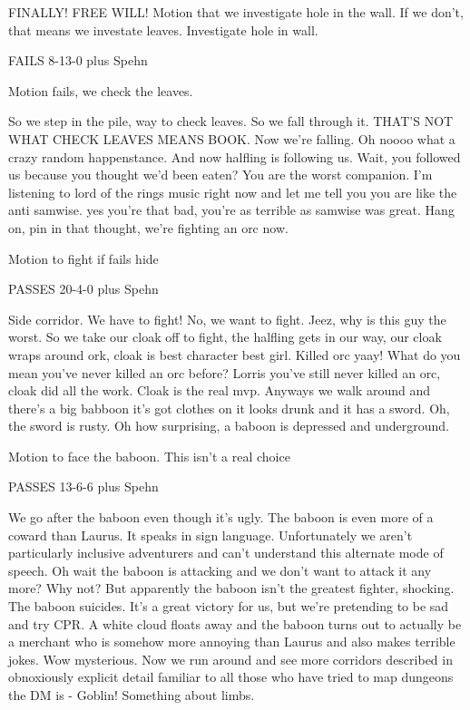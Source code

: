 \documentclass[10pt]{article}
\newcommand{\ps}{ plus Spehn\xspace}
\begin{document}
FINALLY! FREE WILL!
Motion that we investigate hole in the wall. If we don't, that means we investate leaves.
Investigate hole in wall.

FAILS 8-13-0\ps

Motion fails, we check the leaves.

So we step in the pile, way to check leaves. So we fall through it. THAT'S NOT WHAT CHECK LEAVES MEANS BOOK. Now we're falling. Oh noooo what a crazy random happenstance. And now halfling is following us. Wait, you followed us because you thought we'd been eaten? You are the worst companion. I'm listening to lord of the rings music right now and let me tell you you are like the anti samwise. yes you're that bad, you're as terrible as samwise was great. Hang on, pin in that thought, we're fighting an orc now.

Motion to fight if fails hide

PASSES 20-4-0\ps

Side corridor. We have to fight! No, we want to fight. Jeez, why is this guy the worst. So we take our cloak off to fight, the halfling gets in our way, our cloak wraps around ork, cloak is best character best girl. Killed orc yaay! What do you mean you've never killed an orc before? Lorris you've still never killed an orc, cloak did all the work. Cloak is the real mvp. Anyways we walk around and there's a big babboon it's got clothes on it looks drunk and it has a sword. Oh, the sword is rusty. Oh how surprising, a baboon is depressed and underground. 

Motion to face the baboon. This isn't a real choice

PASSES 13-6-6\ps

We go after the baboon even though it's ugly. The baboon is even more of a coward than Laurus. It speaks in sign language. Unfortunately we aren't particularly inclusive adventurers and can't understand this alternate mode of speech. Oh wait the baboon is attacking and we don't want to attack it any more? Why not? But apparently the baboon isn't the greatest fighter, shocking. The baboon suicides. It's a great victory for us, but we're pretending to be sad and try CPR. A white cloud floats away and the baboon turns out to actually be a merchant who is somehow more annoying than Laurus and also makes terrible jokes. Wow mysterious. Now we run around and see more corridors described in obnoxiously explicit detail familiar to all those who have tried to map dungeons the DM is - Goblin! Something about limbs. 
\end{document}
